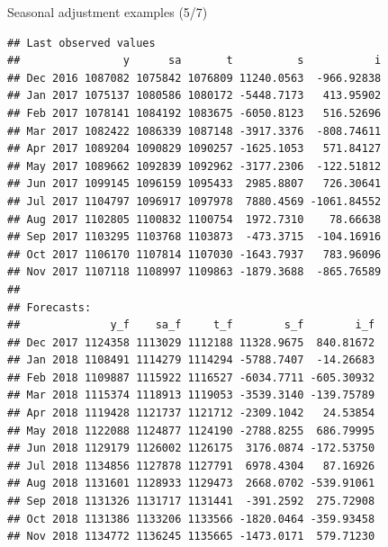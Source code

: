 \documentclass[10pt,xcolor=table,color={dvipsnames,usenames},ignorenonframetext,usepdftitle=false,french]{beamer}
\newenvironment{Shaded}{\begin{snugshade}}{\end{snugshade}}
\newcommand{\OperatorTok}[1]{\textcolor[rgb]{0.81,0.36,0.00}{\textbf{#1}}}
\newcommand{\NormalTok}[1]{#1}
\begin{document}
\begin{frame}[fragile]{Seasonal adjustment examples (5/7)}

\footnotesize

\begin{Shaded}
\end{Shaded}

\begin{verbatim}
## Last observed values
##                y      sa       t          s           i
## Dec 2016 1087082 1075842 1076809 11240.0563  -966.92838
## Jan 2017 1075137 1080586 1080172 -5448.7173   413.95902
## Feb 2017 1078141 1084192 1083675 -6050.8123   516.52696
## Mar 2017 1082422 1086339 1087148 -3917.3376  -808.74611
## Apr 2017 1089204 1090829 1090257 -1625.1053   571.84127
## May 2017 1089662 1092839 1092962 -3177.2306  -122.51812
## Jun 2017 1099145 1096159 1095433  2985.8807   726.30641
## Jul 2017 1104797 1096917 1097978  7880.4569 -1061.84552
## Aug 2017 1102805 1100832 1100754  1972.7310    78.66638
## Sep 2017 1103295 1103768 1103873  -473.3715  -104.16916
## Oct 2017 1106170 1107814 1107030 -1643.7937   783.96096
## Nov 2017 1107118 1108997 1109863 -1879.3688  -865.76589
## 
## Forecasts:
##              y_f    sa_f     t_f        s_f        i_f
## Dec 2017 1124358 1113029 1112188 11328.9675  840.81672
## Jan 2018 1108491 1114279 1114294 -5788.7407  -14.26683
## Feb 2018 1109887 1115922 1116527 -6034.7711 -605.30932
## Mar 2018 1115374 1118913 1119053 -3539.3140 -139.75789
## Apr 2018 1119428 1121737 1121712 -2309.1042   24.53854
## May 2018 1122088 1124877 1124190 -2788.8255  686.79995
## Jun 2018 1129179 1126002 1126175  3176.0874 -172.53750
## Jul 2018 1134856 1127878 1127791  6978.4304   87.16926
## Aug 2018 1131601 1128933 1129473  2668.0702 -539.91061
## Sep 2018 1131326 1131717 1131441  -391.2592  275.72908
## Oct 2018 1131386 1133206 1133566 -1820.0464 -359.93458
## Nov 2018 1134772 1136245 1135665 -1473.0171  579.71230
\end{verbatim}

\end{frame}
\end{document}

